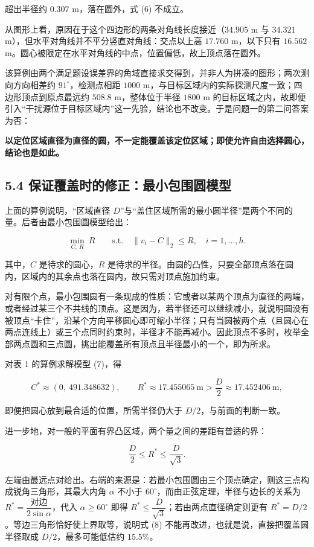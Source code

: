 \documentclass[UTF8,a4paper,zihao=-4,fontset=fandol]{ctexart}
\begin{document}
超出半径约 $0.307$ m，落在圆外，式 (6) 不成立。

从图形上看，原因在于这个四边形的两条对角线长度接近（$34.905$ m 与 $34.321$ m），但水平对角线并不平分竖直对角线：交点以上高 $17.760$ m，以下只有 $16.562$ m。圆心被限定在水平对角线的中点，位置偏低，故上顶点落在圆外。

该算例由两个满足题设误差界的角域直接求交得到，并非人为拼凑的图形；两次测向方向相差约 $91^\circ$，检测点相距 $1000$ m，与目标区域内的实际探测尺度一致；四边形顶点到原点最远约 $508.8$ m，整体位于半径 $1800$ m 的目标区域之内，故即便引入“干扰源位于目标区域内”这一先验，结论也不改变。于是问题一的第二问答案为否：

\textbf{以定位区域直径为直径的圆，不一定能覆盖该定位区域；即使允许自由选择圆心，结论也是如此。}

\subsection*{5.4 保证覆盖时的修正：最小包围圆模型}

上面的算例说明，“区域直径 $D$”与“盖住区域所需的最小圆半径”是两个不同的量。后者由最小包围圆模型给出：

\[
\min_{C,\ R}\ R
\qquad\text{s.t.}\quad\|v_i-C\|_2\le R,\quad i=1,\dots,h . \tag{7}
\]

其中，$C$ 是待求的圆心，$R$ 是待求的半径。由圆的凸性，只要全部顶点落在圆内，区域内的其余点也落在圆内，故只需对顶点施加约束。

对有限个点，最小包围圆有一条现成的性质：它或者以某两个顶点为直径的两端，或者经过某三个不共线的顶点。这是因为，若半径还可以继续减小，就说明圆没有被顶点“卡住”，沿某个方向平移圆心即可缩小半径；只有当圆被两个点（且圆心在两点连线上）或三个点同时约束时，半径才不能再减小。因此顶点不多时，枚举全部两点圆和三点圆，挑出能覆盖所有顶点且半径最小的一个，即为所求。

对表 1 的算例求解模型 (7)，得

\[
C^*\approx(0,\ 491.348632),\qquad
R^*\approx17.455065\ \text{m}>\frac D2\approx17.452406\ \text{m},
\]

即便把圆心放到最合适的位置，所需半径仍大于 $D/2$，与前面的判断一致。

进一步地，对一般的平面有界凸区域，两个量之间的差距有普适的界：

\[
\frac D2\le R^*\le\frac{D}{\sqrt3}. \tag{8}
\]

左端由最远点对给出。右端的来源是：若最小包围圆由三个顶点确定，则这三点构成锐角三角形，其最大内角 $\alpha$ 不小于 $60^\circ$，而由正弦定理，半径与边长的关系为 $R^*=\dfrac{\text{对边}}{2\sin\alpha}$，代入 $\alpha\ge60^\circ$ 即得 $R^*\le\dfrac{D}{\sqrt3}$；若由两点直径确定则更有 $R^*=D/2$。等边三角形恰好使上界取等，说明式 (8) 不能再改进，也就是说，直接把覆盖圆半径取成 $D/2$，最多可能低估约 $15.5\%$。
\end{document}
